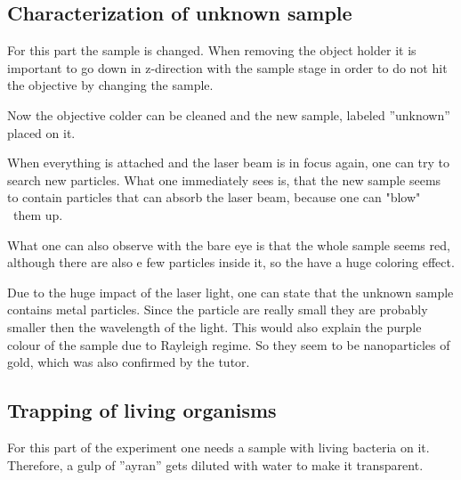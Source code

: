 \documentclass[12pt,english,ngerman]{scrartcl}
\begin{document}
\subsection{Characterization of unknown sample}


For this part the sample is changed. When removing the object holder it is
important to go down in z-direction with the sample stage in order to do not
hit the objective by changing the sample.

Now the objective colder can be cleaned and the new sample, labeled ''unknown''
placed on it.

When everything is attached and the laser beam is in focus again, one can try
to search new particles. What one immediately sees is, that the new sample
seems to contain particles that can absorb the laser beam, because one can
"blow" \ them up.


What one can also observe with the bare eye is that the whole sample seems red,
although there are also e few particles inside it, so the have a huge coloring
effect.

Due to the huge impact of the laser light, one can state that the unknown sample contains
metal particles. Since the particle are really small
they are probably smaller then the wavelength of the light.
This would also explain the purple colour of the sample due to Rayleigh regime.
So they seem to be nanoparticles of gold, which was also confirmed by the tutor.

\subsection{Trapping of living organisms}

For this part of the experiment one needs a sample with living bacteria on it.
Therefore, a gulp of ''ayran'' gets diluted with water to make it transparent.
\end{document}
